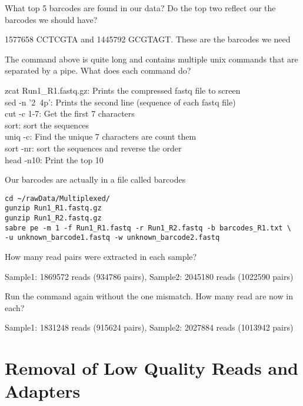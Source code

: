 \begin{questions}
What top 5 barcodes are found in our data? Do the top two reflect our the barcodes we should have?\\
\begin{answer}
1577658 CCTCGTA and 1445792 GCGTAGT. These are the barcodes we need
\end{answer}
The command above is quite long and contains multiple unix commands that are separated by a pipe. What does each command do?
\begin{answer}
zcat Run1_R1.fastq.gz: Prints the compressed fastq file to screen \\
sed -n '2~4p': Prints the second line (sequence of each fastq file) \\
cut -c 1-7: Get the first 7 characters \\
sort: sort the sequences \\
uniq -c: Find the unique 7 characters are count them \\
sort -nr: sort the sequences and reverse the order \\
head -n10: Print the top 10 \\
\end{answer}
\end{questions}

\begin{steps}
Our barcodes are actually in a file called barcodes
\begin{lstlisting}
cd ~/rawData/Multiplexed/
gunzip Run1_R1.fastq.gz
gunzip Run1_R2.fastq.gz
sabre pe -m 1 -f Run1_R1.fastq -r Run1_R2.fastq -b barcodes_R1.txt \
-u unknown_barcode1.fastq -w unknown_barcode2.fastq
\end{lstlisting}
\end{steps}

\begin{questions}
How many read pairs were extracted in each sample? \\
\begin{answer}
Sample1: 1869572 reads (934786 pairs), Sample2: 2045180 reads (1022590 pairs)
\end{answer}
Run the command again without the one mismatch. How many read are now in each? \\
\begin{answer}
Sample1: 1831248 reads (915624 pairs), Sample2: 2027884 reads (1013942 pairs)
\end{answer}
\end{questions}

\section{Removal of Low Quality Reads and Adapters}

